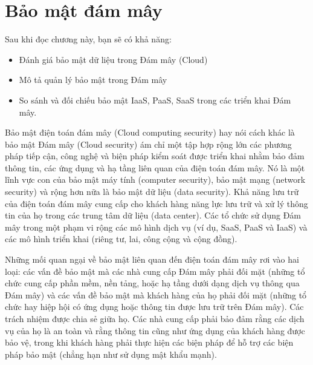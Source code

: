 
\chapter{Bảo mật đám mây}

\begin{learningobjectives}
Sau khi đọc chương này, bạn sẽ có khả năng:
\begin{itemize}
  \item Đánh giá bảo mật dữ liệu trong Đám mây (Cloud)
  \item Mô tả quản lý bảo mật trong Đám mây
  \item So sánh và đối chiếu bảo mật IaaS, PaaS, SaaS trong các triển khai Đám mây.
\end{itemize}
\end{learningobjectives}

Bảo mật điện toán đám mây (Cloud computing security) hay nói cách khác là bảo mật Đám mây (Cloud security) ám chỉ một tập hợp rộng lớn các phương pháp tiếp cận, công nghệ và biện pháp kiểm soát được triển khai nhằm bảo đảm thông tin, các ứng dụng và hạ tầng liên quan của điện toán đám mây. Nó là một lĩnh vực con của bảo mật máy tính (computer security), bảo mật mạng (network security) và rộng hơn nữa là bảo mật dữ liệu (data security). Khả năng lưu trữ của điện toán đám mây cung cấp cho khách hàng năng lực lưu trữ và xử lý thông tin của họ trong các trung tâm dữ liệu (data center). Các tổ chức sử dụng Đám mây trong một phạm vi rộng các mô hình dịch vụ (ví dụ, SaaS, PaaS và IaaS) và các mô hình triển khai (riêng tư, lai, công cộng và cộng đồng).

Những mối quan ngại về bảo mật liên quan đến điện toán đám mây rơi vào hai loại: các vấn đề bảo mật mà các nhà cung cấp Đám mây phải đối mặt (những tổ chức cung cấp phần mềm, nền tảng, hoặc hạ tầng dưới dạng dịch vụ thông qua Đám mây) và các vấn đề bảo mật mà khách hàng của họ phải đối mặt (những tổ chức hay hiệp hội có ứng dụng hoặc thông tin được lưu trữ trên Đám mây). Các trách nhiệm được chia sẻ giữa họ. Các nhà cung cấp phải bảo đảm rằng các dịch vụ của họ là an toàn và rằng thông tin cũng như ứng dụng của khách hàng được bảo vệ, trong khi khách hàng phải thực hiện các biện pháp để hỗ trợ các biện pháp bảo mật (chẳng hạn như sử dụng mật khẩu mạnh).

